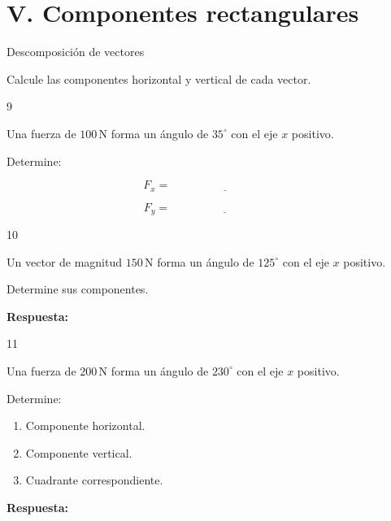 \documentclass[11pt,letterpaper]{article}
\newcommand{\respuesta}{
\vspace{0.3cm}
\textcolor{morado}{\textbf{Respuesta:}}
\hrulefill
\vspace{0.3cm}
}
\newcommand{\espacio}[1]{
\vspace{#1}
}
\begin{document}
\newpage

\section*{V. Componentes rectangulares}

\begin{seccion}{
Descomposición de vectores
}

Calcule las componentes horizontal
y vertical de cada vector.

\end{seccion}

\begin{ejercicio}{9}

Una fuerza de $100\,\mathrm{N}$
forma un ángulo de $35^\circ$
con el eje $x$ positivo.

Determine:

\[
F_x=\underline{\hspace{4cm}}
\]

\[
F_y=\underline{\hspace{4cm}}
\]

\espacio{3cm}

\end{ejercicio}

\begin{ejercicio}{10}

Un vector de magnitud
$150\,\mathrm{N}$ forma
un ángulo de $125^\circ$
con el eje $x$ positivo.

Determine sus componentes.

\espacio{4cm}

\respuesta

\end{ejercicio}
\newpage
\begin{ejercicio}{11}

Una fuerza de $200\,\mathrm{N}$
forma un ángulo de $230^\circ$
con el eje $x$ positivo.

Determine:

\begin{enumerate}[label=\alph*)]
\item Componente horizontal.
\item Componente vertical.
\item Cuadrante correspondiente.
\end{enumerate}

\espacio{4cm}

\respuesta

\end{ejercicio}
\end{document}
